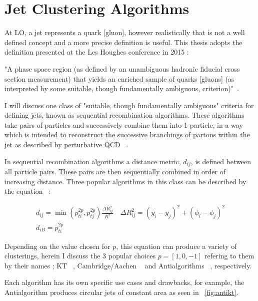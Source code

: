 \section{Jet Clustering Algorithms}\label{secSM:ch1}

At LO, a jet represents a quark [gluon], however realistically that is not a well defined concept and a more precise definition is useful. This thesis adopts the definition presented at the Les Houghes conference in 2015 :\newline

"A phase space region (as defined by an unambiguous hadronic fiducial cross section measurement) that yields an enriched sample of quarks [gluons] (as interpreted by some suitable, though fundamentally ambiguous, criterion)"~\cite{Badger:2016bpw}.\newline 

I will discuss one class of "suitable, though fundamentally ambiguous" criteria for defining jets, known as sequential recombination algorithms. These algorithms take pairs of particles and successively combine them into 1 particle, in a way which is intended to reconstruct the successive branchings of partons within the jet as described by perturbative QCD ~\cite{Marzani:2019hun}.
 
In sequential recombination algorithms a distance metric, $d_{ij}$, is defined between all particle pairs. These pairs are then sequentially combined in order of increasing distance. Three popular algorithms in this class can be described by the equation ~\cite{eq:sequRec}:


\begin{equation}\label{eq:sequRec}
\begin{array}{l}{d_{i j}=\min \left(p_{t i}^{2 p}, p_{t j}^{2 p}\right) \frac{\Delta R_{i j}^{2}}{R^{2}} \quad \Delta R_{i j}^{2}=\left(y_{i}-y_{j}\right)^{2}+\left(\phi_{i}-\phi_{j}\right)^{2}} \\ {d_{i B}=p_{t i}^{2 p}}\end{array}
\end{equation}


Depending on the value chosen for $p$, this equation can produce a variety of clusterings, herein I discuss the 3 popular choices $p = [1, 0, -1]$ refering to them by their names ; KT ~\cite{Ellis:1993tq}, Cambridge/Aachen ~\cite{Dokshitzer:1997in} and Anti\kt algorithms ~\cite{Cacciari:2008gp}, respectively.

Each algorithm has its own specific use cases and drawbacks, for example, the Anti\kt algorithm produces circular jets of constant area as seen in ~\ref{fig:antikt}. 

